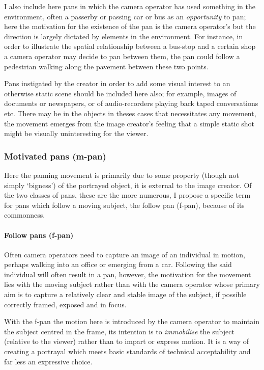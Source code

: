 \documentclass[11pt, oneside, a4paper]{scrartcl}
\begin{document}
I also include here pans in which the camera operator has used something in the environment, often a passerby or passing car or bus as an \emph{opportunity} to pan; here the motivation for the existence of the pan is the camera operator's but the direction is largely dictated by elements in the environment. For instance, in order to illustrate the spatial relationship between a bus-stop and a certain shop a camera operator may decide to pan between them, the pan could follow a pedestrian walking along the pavement between these two points.

Pans instigated by the creator in order to add some visual interest to an otherwise static scene should be included here also; for example, images of documents or newspapers, or of audio-recorders playing back taped conversations etc. There may be in the objects in theses cases that necessitates any movement, the movement emerges from the image creator's feeling that a simple static shot might be visually uninteresting for the viewer.

\subsubsection{Motivated pans  ({\sc m-pan})}

Here the panning movement is primarily due to some property (though not simply `bigness') of the portrayed object, it is external to the image creator. Of the two classes of pans, these are the more numerous, I propose a specific term for pans which follow a moving subject, the follow pan ({\sc f-pan}), because of its commonness.

\paragraph{Follow pans ({\sc f-pan})} Often camera operators need to capture an image of an individual in motion, perhaps walking into an office or emerging from a car. Following the said individual will often result in a pan, however, the motivation for the movement lies with the moving subject rather than with the camera operator whose primary aim is to capture a relatively clear and stable image of the subject, if possible correctly framed, exposed and in focus. 

With the {\sc f-pan} the motion here is introduced by the camera operator to maintain the subject centred in the frame, its intention is to \emph{immobilise} the subject (relative to the viewer) rather than to impart or express motion. It is a way of creating a portrayal which meets basic standards of technical acceptability and far less an expressive choice.
\end{document}
